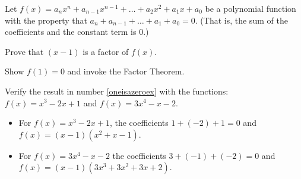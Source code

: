 \documentclass{ximera}
\begin{document}
\begin{problem}\label{oneisazeroex}
Let $f(x) = a_{n} x^{n} + a_{n-1} x^{n-1} + \ldots + a_{2} x^{2} + a_{1} x + a_{0}$ be a polynomial function with the property that $ a_{n}+a_{n-1} + \ldots + a_{1} + a_{0} = 0$.  (That is, the sum of the coefficients and the constant term is $0$.)  

Prove that $(x-1)$ is a factor of $f(x)$.

\begin{hint}
Show $f(1) = 0$ and invoke the Factor Theorem.
\end{hint}
\end{problem}

\begin{problem}
Verify the result in number \ref{oneisazeroex} with the functions: $f(x) = x^3 - 2x + 1$ and  $f(x) = 3x^4-x-2$.

\begin{solution}
\begin{itemize}

\item For $f(x) = x^3 - 2x + 1$, the coefficients $1+(-2) + 1 = 0$ and $f(x) = (x-1)(x^2+x-1)$.

\item  For $f(x) = 3x^4-x-2$ the coefficients $3+(-1)+(-2) = 0$ and $f(x) = (x-1)(3x^3+3x^2+3x+2)$.

\end{itemize}
\end{solution}
\end{problem}
\end{document}
